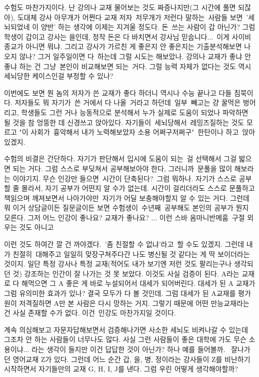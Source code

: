 수험도 마찬가지이다.
난 강의나 교재 물어보는 것도 짜증나지만(그 시간에 풀면 되잖아),
도대체 강사 아무개가 어쩐다 교재 저자 저무개가 저런다 말하는 사람들 보면 '세뇌되었네 이 양반' 하는 생각에 이제는 지겨울 정도다.
돈 쓰는 사람이 갑 아닌가? 그럼 학생이 갑이고 강사는 을인데, 정작 돈은 다 바치면서 강사님 믿숩니다... 이게 사이비 종교가 아니면 뭐냐.
그리고 강사가 가르친 게 좋은지 안 좋은지는 기출분석해보면 나오지 않나? 그거 일주일이면 다 하는데 그럴 시도는 해보았나.
강의나 교재가 좋냐 안 좋냐 하는 건 그냥 본인이 비교해보면 되는 거다.
그럴 능력 자체가 없다는 것도 역시 세뇌당한 케이스인걸 부정할 수 있나?
\vspace{5mm}

이번에도 보면 뭔 놈의 저자가 쓴 교재가 좋다 하더니 역시나 수능 끝나고 다들 침묵이다.
저자들도 뭐 자기가 쓴 거에서 다 나올 거라고 하던데 일부 빼고는 걍 꿀먹은 벙어리고,
학생들도 그런 거나 능동적으로 분석해서 누가 실제로 도움이 되었나 파악하면 될 것을 참 엉뚱한 데 신경쓰고 앉아있다.
자기들이 세뇌당해서 레밍즈질하는 것도 모르고 "이 사회가 흉악해서 내가 노력해보았자 소용 어쩌구저쩌구" 한탄이나 하고 앉아있겠지.
\vspace{5mm}

수험의 비결은 간단하다. 자기가 판단해서 입시에 도움이 되는 걸 선택해서 그걸 밟으면 되는 거다.
그럼 스스로 부딪쳐서 공부해보아야 한다, 그러니까 문풀을 많이 해보라는 이야기지.
무슨 인강만 들으면 시간이 단축된다? 그럼 뭐하나. 자기가 스스로 공부할 줄 몰라서, 자기 공부가 어떤지 알 수가 없는데.
시간이 걸리더라도 스스로 문풀하고 책읽으며 깨져보면서 나아가야만 자기가 어딜 보충해야할지 알 수 있는 거다.
그런데 뭐 이거 상담글이든 질문글이든 보면 수험생이 수년째 공부해도 본인의 공부가 뭔지 모른다.
그저 어느 인강이 좋나요? 교재가 좋나요? ... 이런 스바 옴마니반메훔 구절 외우는 것도 아니고
\vspace{5mm}

이런 것도 하여간 깔 건 까야겠다. '좀 친절할 수 없냐'라고 할 수도 있겠지.
그런데 내가 친절히 대해주고 일일히 맞장구쳐주다간 나도 병신될 것 같다는 게 딱 보이더라는 것이지.
일단 특정 강사나 특정 교재(적어도 내가 보기엔 저런 것도 팔리는구나 생각되던 것) 강조하는 인간이 잘 나가는 것 못 보았다.
이것도 사실 검증이 된다. A라는 교재로 다 해먹으면 그 A 좋은 게 바로 누설되어서 대세가 되어버린다.
대세가 된 A 교재가 그럼 유의미한 효과가 있나? 결국 모두가 다 볼 것인데.
그럼 대세가 된 A교재를 평가원이 저격질하면 A만 본 사람은 다시 망하는 거지.
그렇기 때문에 어떤 만능교재라는 건 사실 존재할 수가 없다. 이건 인강도 마찬가지일 것이다.
\vspace{5mm}

계속 의심해보고 자문자답해보면서 검증해나가면 사소한 세뇌도 비켜나갈 수 있는데 그조차 안 하는 사람들이 너무나도 많다.
사실 그런 사람들이 좋은 대학에 가도 무슨 소용이냐... 라는 생각이 들지만 이건 답답한 것이 아닌가?
하나 예를 들어볼까.  잘나가던 영어교재 Z가 있다.
그런데 어느 순간 갑, 을, 병, 정이라는 강사들이 Z를 비난하기 시작하면서 자기들만의 교재 G, H, I, J를 낸다.
그럼 우린 어떻게 생각해야할까?
\vspace{5mm}

